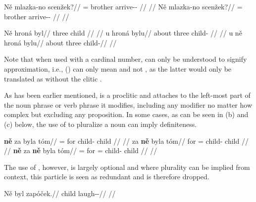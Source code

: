 \pex
\begingl
    \gla N\v{e} mlazka-no scenžek?//
    \glb \Hon{}= brother arrive-\Av{}-\Pf{} //
    \glft {}//
\endgl
\xe
\pex
\begingl
    \gla N\v{e} mlazka-no scenžek?//
    \glb \Hon{}= brother arrive-\Av{}-\Pf{} //
    \glft {}//
\endgl
\xe

\pex
\a
\begingl{}
    \gla N\v{e} hroná byl//
    \glb {} three child //
    \glft {}//
\endgl
\a
\begingl
    \gla u hroná bylu//
    \glb about three child-\Ins{} //
    \glft {}//
\endgl
\a
\begingl
    \gla u n\v{e} hroná bylu//
    \glb about  three child-\Ins{}//
    \glft {}//
\endgl
\xe

Note that when used with a cardinal number,  can only be understood to signify approximation, i.e., () can only mean  and not , as the latter would only be translated as  without the clitic .

As has been earlier mentioned,  is a proclitic and attaches to the left-most part of the noun phrase or verb phrase it modifies, including any modifier no matter how complex but excluding any proposition. In some cases, as can be seen in (b) and (c) below, the use of  to pluralize a noun can imply definiteness.

\pex
\a
\begingl{}
    \gla \textbf{n\v{e}} za byla tóm//
    \glb \Pl{}= for child-\Acc{} child //
    \glft {}//
\endgl
\a
\begingl{}
    \gla za \textbf{n\v{e}} byla tóm//
    \glb for \Pl{}= child-\Acc{} child //
    \glft {}//
\endgl
\a
\begingl{}
    \gla \textbf{n\v{e}} za \textbf{n\v{e}} byla tóm//
    \glb \Pl{}= for \Pl{}= child-\Acc{} child //
    \glft {}//
\endgl
\xe





The use of , however, is largely optional and where plurality can be implied from context, this particle is seen as redundant and is therefore dropped.

\pex
\begingl
\gla N\v{e} byl zapóček.//
\glb \Pl{} child laugh-\Av{}-\Pf{}//
\glft {}//
\endgl
\xe

